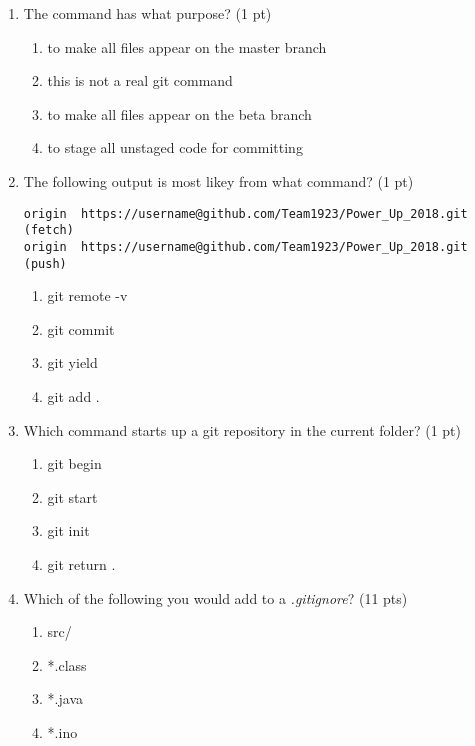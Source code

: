 \documentclass[11pt,fleqn]{article}
\begin{document}
\begin{enumerate}

\item The command  has what purpose? (1 pt)
	\begin{enumerate}
    	\item to make all files appear on the master branch
    	\item this is not a real git command
    	\item to make all files appear on the beta branch
    	\item to stage all unstaged code for committing
	\end{enumerate}

\item The following output is most likey from what command? (1 pt)
\begin{verbatim}
origin  https://username@github.com/Team1923/Power_Up_2018.git (fetch)
origin  https://username@github.com/Team1923/Power_Up_2018.git (push)
\end{verbatim}

	\begin{enumerate}
    	\item git remote -v
    	\item git commit
    	\item git yield 
    	\item git add .
	\end{enumerate}

\item Which command starts up a git repository in the current folder? (1 pt) %
	\begin{enumerate}
    	\item git begin
    	\item git start
    	\item git init
    	\item git return .
	\end{enumerate}

\newpage

\item Which of the following you would add to a \textit{.gitignore}? (11 pts)
	\begin{enumerate}
    	\item src/
    	\item *.class
    	\item *.java
    	\item *.ino
	\end{enumerate}


\end{enumerate}
\end{document}
